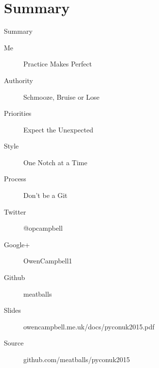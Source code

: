 \documentclass[14pt]{beamer}
\begin{document}
  \section*{Summary}
    \blankscreen{}

    \begin{frame}{Summary}
      \begin{description}
        \item [Me] Practice Makes Perfect
        \pause
        \item [Authority] Schmooze, Bruise or Lose
        \pause
        \item [Priorities] Expect the Unexpected
        \pause
        \item [Style] One Notch at a Time
        \pause
        \item [Process] Don't be a Git
      \end{description}
    \end{frame}

    \begin{frame}{}
      \begin{description}
        \item [Twitter] @opcampbell
        \item [Google+] OwenCampbell1
        \item [Github] meatballs
      \end{description}
      \vfill
      \begin{description}
        \item [Slides] {\small owencampbell.me.uk/docs/pyconuk2015.pdf}
        \item [Source] {\small github.com/meatballs/pyconuk2015}
      \end{description}
    \end{frame}
\end{document}
